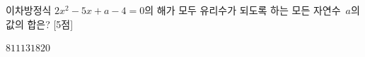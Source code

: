 이차방정식 $2x^2-5x+a-4=0$의 해가 모두 유리수가 되도록 하는 모든 자연수~$a$의 값의 합은? \mbox{[5점]}
\begin{choices32}{$8$}{$11$}{$13$}{$18$}{$20$}\end{choices32}
